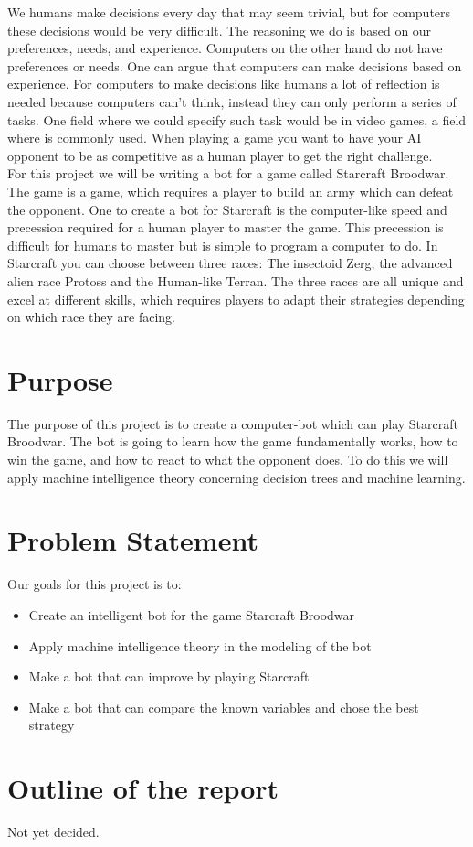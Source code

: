 	We humans make decisions every day that may seem trivial, but for computers these decisions would be very difficult. The reasoning we do 
	is based on our preferences, needs, and experience. Computers on the other hand do not have preferences or needs. One can argue that computers can
	make decisions based on experience.
	For computers to make decisions like humans a lot of reflection is needed because computers can't think, instead they can only perform a series of tasks.
	One field where we could specify such task would be in video games, a field where \abai is commonly used. When playing 
	a game you want to have your AI opponent to be as competitive as a human player to get the right challenge. \\
	
	For this project we will be writing a bot for a game called Starcraft Broodwar. The game is a \abrts game, which requires a player to build an army 
	which can defeat the opponent. One to create a bot for Starcraft is the computer-like speed and precession required for a human player to master the game. 
	This precession is difficult for humans to master but is simple to program a computer to do.
	In Starcraft you can choose between three races: The insectoid Zerg, the advanced alien race Protoss and the Human-like Terran. 
	The three races are all unique and excel at different skills, which requires players to adapt their strategies depending on which race they are facing.


\section{Purpose}
	The purpose of this project is to create a computer-bot which can play Starcraft Broodwar. 
	The bot is going to learn how the game fundamentally works, 
	how to win the game, and how to react to what the opponent does. 
	To do this we will apply machine intelligence theory concerning decision trees and machine learning.


\section{Problem Statement}
	Our goals for this project is to:
	\begin{itemize}
		\item Create an intelligent bot for the game Starcraft Broodwar
		\item Apply machine intelligence theory in the modeling of the bot
		\item Make a bot that can improve by playing Starcraft
		\item Make a bot that can compare the known variables and chose the best strategy
	\end{itemize}

\section{Outline of the report}
	Not yet decided.